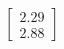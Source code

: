 \documentclass[preview]{standalone}
\begin{document}
\begin{align*}
\begin{bmatrix} 2.29 \\ 2.88 \end{bmatrix}
\end{align*}
\end{document}
